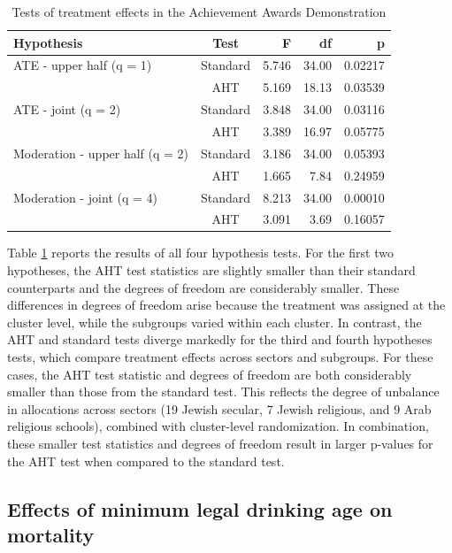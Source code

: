 \documentclass[12pt]{article}\usepackage[]{graphicx}\usepackage[]{color}
\begin{document}
\begin{table}[bth]
\centering
\caption{Tests of treatment effects in the Achievement Awards Demonstration} 
\label{tab:AAD}
\begin{tabular}{lcrrr}
  \toprule
Hypothesis & Test & F & df & p \\ 
  \midrule
ATE - upper half (q = 1) & Standard & 5.746 & 34.00 & 0.02217 \\ 
   & AHT & 5.169 & 18.13 & 0.03539 \\ 
  ATE - joint (q = 2) & Standard & 3.848 & 34.00 & 0.03116 \\ 
   & AHT & 3.389 & 16.97 & 0.05775 \\ 
   \midrule
Moderation - upper half (q = 2) & Standard & 3.186 & 34.00 & 0.05393 \\ 
   & AHT & 1.665 & 7.84 & 0.24959 \\ 
  Moderation - joint (q = 4) & Standard & 8.213 & 34.00 & 0.00010 \\ 
   & AHT & 3.091 & 3.69 & 0.16057 \\ 
   \bottomrule
\end{tabular}
\end{table}


Table \ref{tab:AAD} reports the results of all four hypothesis tests. 
For the first two hypotheses, the AHT test statistics are slightly smaller than their standard counterparts and the degrees of freedom are considerably smaller. 
These differences in degrees of freedom arise because the treatment was assigned at the cluster level, while the subgroups varied within each cluster. 
In contrast, the AHT and standard tests diverge markedly for the third and fourth hypotheses tests, which compare treatment effects across sectors and subgroups.
For these cases, the AHT test statistic and degrees of freedom are both considerably smaller than those from the standard test. 
This reflects the degree of unbalance in allocations across sectors (19 Jewish secular, 7 Jewish religious, and 9 Arab religious schools), combined with cluster-level randomization. 
In combination, these smaller test statistics and degrees of freedom result in larger p-values for the AHT test when compared to the standard test. 

\subsection{Effects of minimum legal drinking age on mortality} 
\end{document}
